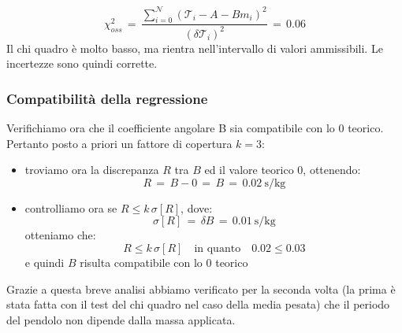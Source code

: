 \begin{equation*}
	\chi_{oss}^2 \,=\, \frac{\sum_{i=0}^{\mathcal{N}} (\mathcal{T}_i - A - Bm_i)^2}{(\delta \mathcal{T}_i)^2} \,=\, 0.06
\end{equation*}
%
Il chi quadro è molto basso, ma rientra nell'intervallo di valori ammissibili. Le incertezze sono quindi corrette.

\subsubsection{Compatibilità della regressione}


Verifichiamo ora che il coefficiente angolare B sia compatibile con lo 0 teorico.
Pertanto posto a priori un fattore di copertura $k = 3$:

\begin{itemize}
			
	\item{troviamo ora la discrepanza $R$ tra $B$ ed il valore teorico 0, ottenendo:
			\begin{equation*}
				R \,=\, B - 0 \,=\, B \,=\, \SI{0.02}{\second\per\kilo\gram}
			\end{equation*}
			}
	\item{controlliamo ora se $R \leq k\,\sigma[R]$, dove:
			\begin{equation*}
				\sigma[R] \,=\, \delta B \,=\, \SI{0.01}{\second\per\kilo\gram}	
			\end{equation*}
			otteniamo che:
			\begin{equation*}
				R \leq k\,\sigma[R] \quad \text{in quanto} \quad 0.02 \leq 0.03
			\end{equation*}
			e quindi $B$ risulta compatibile con lo 0 teorico}			
\end{itemize}
Grazie a questa breve analisi abbiamo verificato per la seconda volta (la prima è stata fatta con il test del chi quadro nel caso della media
pesata) che il periodo del pendolo non dipende dalla massa applicata.

